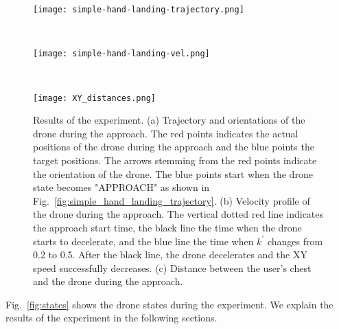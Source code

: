 \begin{figure}
        \begin{minipage}[t]{\columnwidth}
          \centering
          \texttt{[image: simple-hand-landing-trajectory.png]}
          \subcaption{}
          \label{fig:simple_hand_landing_trajectory}
        \end{minipage} \\
        \begin{minipage}[t]{\columnwidth}
          \centering
          \texttt{[image: simple-hand-landing-vel.png]}
          \subcaption{}
          \label{fig:simple_hand_landing_vel}
        \end{minipage} \\
        \begin{minipage}[t]{\columnwidth}
          \centering
          \texttt{[image: XY\_distances.png]}
          \subcaption{}
          \label{fig:simple_hand_landing_xy_distances}
        \end{minipage}
    \caption{Results of the experiment. 
    (a) Trajectory and orientations of the drone during the approach.
    The red points indicates the actual positions of the drone during the approach and the blue points the target positions. 
    The arrows stemming from the red points indicate the orientation of the drone.
    The blue points start when the drone state becomes "APPROACH" as shown in Fig.~\ref{fig:simple_hand_landing_trajectory}.
    (b) Velocity profile of the drone during the approach. 
    The vertical dotted red line indicates the approach start time,
    the black line the time when the drone starts to decelerate,
    and the blue line the time when $k^\prime$ changes from 0.2 to 0.5.
    After the black line, the drone decelerates and the XY speed successfully decreases.
    (c) Distance between the user's chest and the drone during the approach.
}
\end{figure}

Fig.~\ref{fig:states} shows the drone states during the experiment.
We explain the results of the experiment in the following sections.

